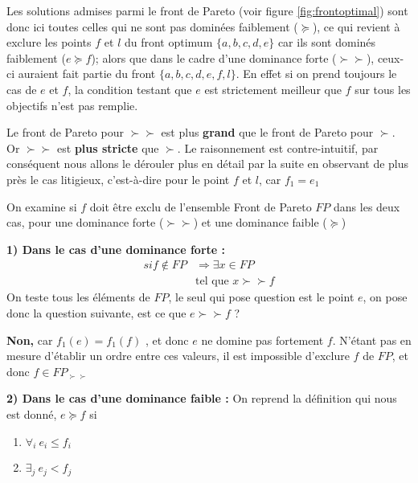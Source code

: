 Les solutions admises parmi le front de Pareto (voir figure \ref{fig:frontoptimal}) sont donc ici toutes celles qui ne sont pas dominées faiblement ($\succeq$), ce qui revient à exclure les points $f$ et $l$ du front optimum $\{a,b,c,d,e\}$ car ils sont dominés faiblement ($e \succeq f$); alors que dans le cadre d'une dominance forte ($\succ \succ$), ceux-ci auraient fait partie du front $\{a,b,c,d,e,f,l\}$. En effet si on prend toujours le cas de $e$ et $f$, la condition testant que $e$ est strictement meilleur que $f$ sur tous les objectifs n'est pas remplie.


Le front de Pareto pour $\succ \succ$ est plus \textbf{grand} que le front de Pareto pour $ \succ $. Or $\succ \succ$ est \textbf{plus stricte} que $\succ$. Le raisonnement est contre-intuitif, par conséquent nous allons le dérouler plus en détail par la suite en observant de plus près le cas litigieux, c'est-à-dire pour le point $f$ et $l$, car $f_1 = e_1$

On examine si $f$ doit être exclu de l'ensemble Front de Pareto $FP$ dans les deux cas, pour une dominance forte ($\succ \succ$) et une dominance faible ($\succeq$)

\textbf{1) Dans le cas d'une dominance forte : }
\begin{align*}
     si f \notin FP & \Rightarrow \exists x \in FP \\
     & \text{tel que }  x \succ \succ f
\end{align*}
On teste tous les éléments de $FP$, le seul qui pose question est le point $e$, on pose donc la question suivante, est ce que $e \succ \succ f$ ?

\textbf{Non,} car $f_1(e) = f_1(f)$ , et donc $e$ ne domine pas fortement $f$. N'étant pas en mesure d'établir un ordre entre ces valeurs, il est impossible d'exclure $f$ de $FP$, et donc $ f \in FP_{\succ \succ}$

\textbf{2) Dans le cas d'une dominance faible : }
On reprend la définition qui nous est donné, $ e \succeq f$ si
\begin{enumerate}[label=(\arabic*),labelindent=\parindent,leftmargin=*]
\item $ \forall_i \ e_i \leq f_i$
\item $ \exists_j \ e_j < f_j$
\end{enumerate}

